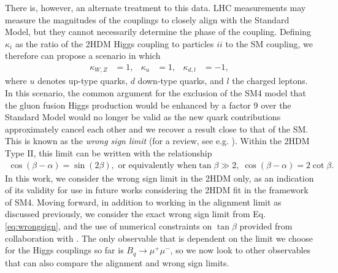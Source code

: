 \documentclass[a4paper,12pt]{article}
\begin{document}
There is, however, an alternate treatment to this data. 
LHC measurements may measure the magnitudes of the couplings to closely align with the Standard Model, but they cannot necessarily determine the phase of the coupling. 
Defining $\kappa_i$ as the ratio of the 2HDM Higgs coupling to particles $ii$ to the SM coupling, we therefore can propose a scenario in which 
\begin{align}
    \kappa_{W,Z} &= 1, & \kappa_u &= 1, & \kappa_{d,l} &= -1,
\end{align}
where $u$ denotes up-type quarks, $d$ down-type quarks, and $l$ the charged leptons.
In this scenario, the common argument for the exclusion of the SM4 model that the gluon fusion Higgs production would be enhanced by a factor 9 over the Standard Model would no longer be valid as the new quark contributions approximately cancel each other and we recover a result close to that of the SM.
This is known as the \emph{wrong sign limit} (for a review, see e.g. \cite{wrong1,wrong2}).
Within the 2HDM Type II, this limit can be written with the relationship
\begin{align}
    \label{eq:wrongsign}
    \cos(\beta-\alpha) = \sin(2\beta), \text{ or equivalently when} \tan\beta\gg2,\; \cos(\beta-\alpha) = 2\cot\beta.
\end{align}
In this work, we consider the wrong sign limit in the 2HDM only, as an indication of its validity for use in future works considering the 2HDM fit in the framework of SM4. 
Moving forward, in addition to working in the alignment limit as discussed previously, we consider the exact wrong sign limit from Eq. \ref{eq:wrongsign}, and the use of numerical constraints on $\tan\beta$ provided from collaboration with \cite{oliver}.
The only observable that is dependent on the limit we choose for the Higgs couplings so far is $B_q\to\mu^+\mu^-$, so we now look to other observables that can also compare the alignment and wrong sign limits.
\end{document}
